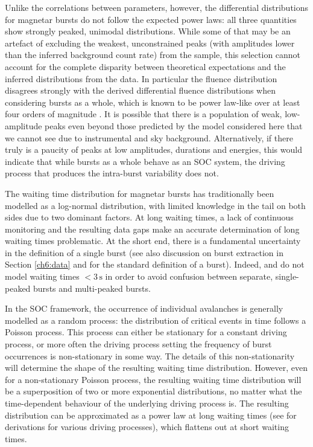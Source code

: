 \documentclass[12pt]{emulateapj}
\begin{document}
 Unlike the correlations between parameters, however, the differential
 distributions for magnetar bursts do not follow the expected power laws: all three quantities show strongly peaked, unimodal distributions.
 While some of that may be an artefact of excluding the weakest, unconstrained peaks (with amplitudes lower than the inferred
 background count rate) from the sample, this selection cannot account for the complete disparity between theoretical 
 expectations and the inferred distributions from the data. In particular the fluence distribution disagrees strongly
 with the derived differential fluence distributions when considering bursts as a whole, which is known to be power law-like over at least 
 four orders of magnitude \citep{gogus1999,gogus2000,prieskorn2012}.
 It is possible that there is a population of weak, low-amplitude peaks even beyond those predicted by the model considered 
 here that we cannot see due to instrumental and sky background.
Alternatively, if there truly is a paucity of peaks at low amplitudes, durations and energies, this would indicate that while bursts as a
whole behave as an SOC system, the driving process that produces the intra-burst variability does not.

The waiting time distribution for magnetar bursts has traditionally been modelled as a log-normal distribution, with limited knowledge 
in the tail on both sides due to two dominant factors. At long waiting times, a lack of continuous monitoring and the resulting data gaps
make an accurate determination of long waiting times problematic. At the short end, there is a fundamental uncertainty in the definition of 
a single burst (see also discussion on burst extraction in Section \ref{ch6:data} and \citealp{vanderhorst2012} for the standard definition of a burst). 
Indeed, \citet{gogus1999}  and \citet{gogus2000} do not model waiting times $<3\,\mathrm{s}$ in order to avoid confusion between 
separate, single-peaked bursts and multi-peaked bursts. 

In the SOC framework, the occurrence of individual avalanches is generally modelled as a random process: the distribution of critical events in time
follows a Poisson process. This process can either be stationary for a constant driving process, or more often the driving process setting the frequency
of burst occurrences is non-stationary in some way. The details of this non-stationarity will determine the shape of the resulting waiting time distribution.
However, even for a non-stationary Poisson process, the resulting waiting time distribution will be a superposition of two or more exponential distributions,
no matter what the time-dependent behaviour of the underlying driving process is. The resulting distribution 
can be approximated as a power law at long waiting times (see \citealp{aschwanden2011} for derivations for various driving processes), which flattens out at 
short waiting times. 
\end{document}
